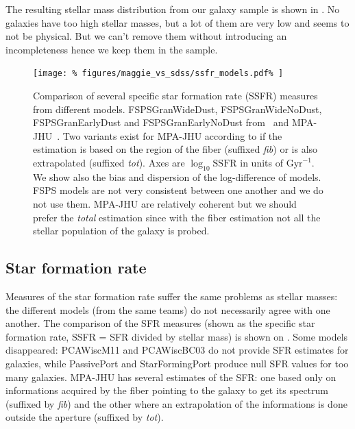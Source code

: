 The resulting stellar mass distribution from our galaxy sample is shown in
. No galaxies have too high stellar
masses, but a lot of them are very low and seems to not be physical. But we
can't remove them without introducing an incompleteness hence we keep them in
the sample.

\begin{figure}[htp]
    \centering
    \texttt{[image: \%
        figures/maggie\_vs\_sdss/ssfr\_models.pdf\%
    ]}
    \caption{Comparison of several specific star formation rate (SSFR) measures
        from different models. FSPSGranWideDust, FSPSGranWideNoDust,
        FSPSGranEarlyDust and FSPSGranEarlyNoDust from~\cite{Conroy+09} and
        MPA-JHU~\cite{Brinchmann+04, Kauffmann+03, Tremonti+04}. Two variants
        exist for MPA-JHU according to if the estimation is based on the region
        of the fiber (suffixed \emph{fib}) or is also extrapolated (suffixed
        \emph{tot}). Axes are $\log_{10} \mathrm{SSFR}$ in units of
        $\mathrm{Gyr}^{-1}$. We show also the bias and dispersion of the
        log-difference of models. FSPS models are not very consistent between
        one another and we do not use them. MPA-JHU are relatively coherent but
    we should prefer the \emph{total} estimation since with the fiber
estimation not all the stellar population of the galaxy is
probed.\label{fig:sfr_comparison}}
\end{figure}

\subsection{Star formation rate}
\label{sub:star_formation_rate}

Measures of the star formation rate suffer the same problems as stellar masses:
the different models (from the same teams) do not necessarily agree with one
another. The comparison of the SFR measures (shown as the specific star
formation rate, SSFR = SFR divided by stellar mass) is shown on
. Some models disappeared: PCAWiscM11 and
PCAWiscBC03 do not provide SFR estimates for galaxies, while PassivePort and
StarFormingPort produce null SFR values for too many galaxies. MPA-JHU has
several estimates of the SFR\@: one based only on informations acquired by
the fiber pointing to the galaxy to get its spectrum (suffixed by \emph{fib})
and the other where an extrapolation of the informations is done outside the
aperture (suffixed by \emph{tot}).

